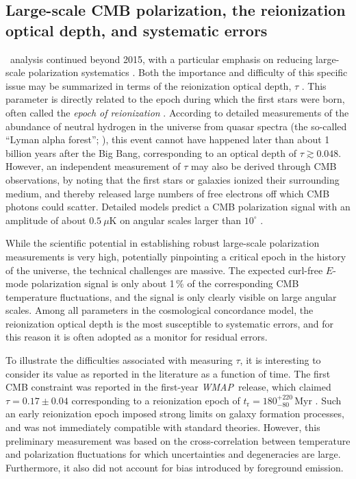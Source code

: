 \documentclass[onecolumn]{aa}
\def\WMAP{\emph{WMAP}}
\begin{document}
\subsection{Large-scale CMB polarization, the reionization optical depth, and systematic errors}
\label{sec:tau_intro}


\Planck\ analysis continued beyond 2015, with a particular emphasis on
reducing large-scale polarization systematics
\citep{planck2016-l01}. Both the importance and difficulty of this
specific issue may be summarized in terms of the reionization optical depth, $\tau$
\citep[e.g.,][]{planck2014-a25}. This parameter is directly related to
the epoch during which the first stars
were born, often called the \emph{epoch of reionization}
\citep[e.g.,][and references therein]{loeb:2001}. According to
detailed measurements of the abundance of neutral hydrogen in the
universe from quasar spectra (the so-called ``Lyman alpha forest'';
\citealp{gunn:1965}), this event cannot have happened later than about
1 billion years after the Big Bang, corresponding to an optical depth
of $\tau\gtrsim0.048$. However, an independent measurement of $\tau$
may also be derived through CMB observations, by noting that the first
stars or galaxies ionized their surrounding medium, and thereby
released large numbers of free electrons off which CMB photons could
scatter. Detailed models predict a CMB polarization signal with an
amplitude of about $0.5~\mu\textrm{K}$ on angular scales larger
than $10^{\circ}$ \citep[e.g.,][and references
  therein]{alvarez:2006}.

While the scientific potential in
establishing robust large-scale polarization measurements is very
high, potentially pinpointing a critical epoch in the history of the
universe, the technical challenges are massive. The expected curl-free
$E$-mode polarization signal is only about 1\,\% of the corresponding
CMB temperature fluctuations, and the signal is only clearly visible on large
angular scales. Among all parameters in the cosmological concordance
model, the reionization optical depth is the most susceptible to
systematic errors, and for this reason it is often adopted as a
monitor for residual errors.

To illustrate the difficulties associated with measuring $\tau$, it is
interesting to consider its value as reported in the literature as a
function of time. The first CMB constraint was reported in the
first-year \WMAP\ release, which claimed $\tau=0.17\pm0.04$
corresponding to a reionization epoch of $t_{\mathrm{r}} =
180^{+220}_{-80}\,\textrm{Myr}$ \citep{kogut2003}. Such an early
reionization epoch imposed strong limits on galaxy formation
processes, and was not immediately compatible with standard
theories. However, this preliminary measurement was based on the
cross-correlation between temperature and polarization fluctuations
for which uncertainties and degeneracies are large. Furthermore, it
also did not account for bias introduced by foreground emission.
\end{document}
